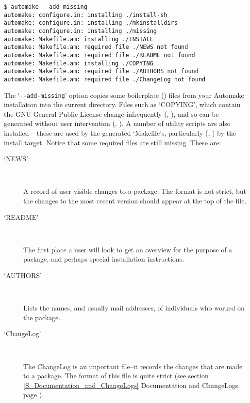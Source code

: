 \begin{Verbatim}[frame=single]
$ automake --add-missing
automake: configure.in: installing ./install-sh
automake: configure.in: installing ./mkinstalldirs
automake: configure.in: installing ./missing
automake: Makefile.am: installing ./INSTALL
automake: Makefile.am: required file ./NEWS not found
automake: Makefile.am: required file ./README not found
automake: Makefile.am: installing ./COPYING
automake: Makefile.am: required file ./AUTHORS not found
automake: Makefile.am: required file ./ChangeLog not found
\end{Verbatim}

The `\verb+--add-missing+' option copies some boilerplate ({\MbQ{}})
files from your Automake installation into the current directory. Files such as `COPYING', which contain the GNU General Public License change 
infrequently ({\MhQ{}}, {\MhQ{}}), and so can be generated without user 
intervention ({\MdQ{}}, {\MfQ{}}). A number of utility scripts are also
installed -- these are used by the generated `Makefile's,
particularly ({\MbQ{}}, {\MeQ{}}) by the install target. Notice that some required files are still missing. These are: 

\begin{description}
\item[`NEWS']
\ 

A record of user-visible changes to a package. The format is not strict, but the changes to the most recent version should appear at the top of the file. 

\item[`README']
\ 

The first place a user will look to get an overview for the purpose of 
a package, and perhaps special installation instructions. 

\item[`AUTHORS']
\ 

Lists the names, and usually mail addresses, of individuals who worked on the package. 

\item[`ChangeLog']
\ 

The ChangeLog is an important file--it records the changes that are made to a 
package. The format of this file is quite strict
(see section \ref{S_Documentation_and_ChangeLogs} Documentation and ChangeLogs,
page \pageref{S_Documentation_and_ChangeLogs}). 
\end{description}

